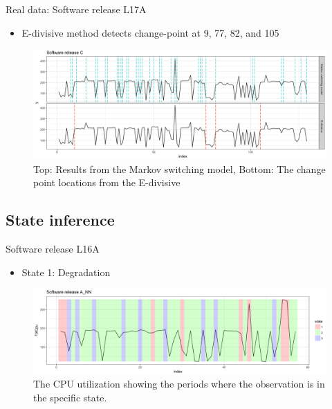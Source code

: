 \documentclass{beamer}
\begin{document}
\begin{frame}
Real data: Software release L17A

\begin{itemize}
\item E-divisive method detects change-point at 9, 77, 82, and 105
\end{itemize}

\begin{figure}
\includegraphics[width=1\linewidth]{compare_L17A}
\caption{Top: Results from the Markov switching model, Bottom: The change point locations from the E-divisive}
\end{figure}
\end{frame}

\subsection{State inference}
\begin{frame}
Software release L16A
\pause

\begin{itemize}
\item State 1: Degradation
\end{itemize}

\begin{figure}
\includegraphics[width=1\linewidth]{L16A_NN1}
\caption{The CPU utilization showing the periods where the observation is in the specific state.}
\end{figure}

\end{frame}
\end{document}
